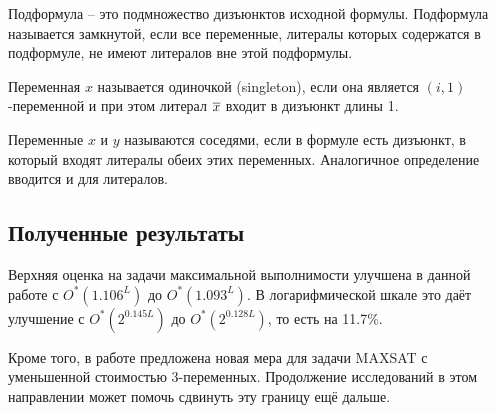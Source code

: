 Подформула -- это подмножество дизъюнктов исходной формулы. Подформула называется замкнутой, если все переменные, литералы которых содержатся в подформуле, не имеют литералов вне этой подформулы.

Переменная $x$ называется одиночкой (singleton), если она является $(i,1)$-переменной и при этом литерал $\overline{x}$ входит в дизъюнкт длины 1.

Переменные $x$ и $y$ называются соседями, если в формуле есть дизъюнкт, в который входят литералы обеих этих переменных. Аналогичное определение вводится и для литералов.

\subsection*{Полученные результаты}

\firstpar{}Верхняя оценка на задачи максимальной выполнимости улучшена в данной работе с $O^*(1.106^L)$ до $O^*(1.093^L)$. В логарифмической шкале это даёт улучшение с $O^*(2^{0.145L})$ до $O^*(2^{0.128L})$, то есть на 11.7\%.

Кроме того, в работе предложена новая мера для задачи MAXSAT с уменьшенной стоимостью 3-переменных. Продолжение исследований в этом направлении может помочь сдвинуть эту границу ещё дальше.

